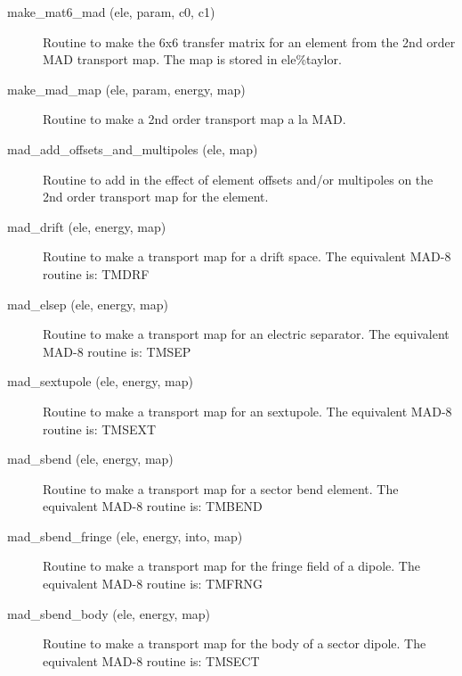 \begin{description}

\label{r:make.mat6.mad}
\item[make_mat6_mad (ele, param, c0, c1)] \Newline 
     Routine to make the 6x6 transfer matrix for an element from the 
     2nd order MAD transport map. The map is stored in ele\%taylor.

\label{r:make.mad.map}
\item[make_mad_map (ele, param, energy, map)] \Newline 
     Routine to make a 2nd order transport map a la MAD.

\label{r:mad.add.offsets.and.multipoles}
\item[mad_add_offsets_and_multipoles (ele, map)] \Newline 
     Routine to add in the effect of element offsets and/or multipoles
     on the 2nd order transport map for the element.

\label{r:mad.drift}
\item[mad_drift (ele, energy, map)] \Newline 
     Routine to make a transport map for a drift space.
     The equivalent MAD-8 routine is: TMDRF

\label{r:mad.elsep}
\item[mad_elsep (ele, energy, map)] \Newline 
     Routine to make a transport map for an electric separator. 
     The equivalent MAD-8 routine is: TMSEP

\label{r:mad.sextupole}
\item[mad_sextupole (ele, energy, map)] \Newline 
     Routine to make a transport map for an sextupole.
     The equivalent MAD-8 routine is: TMSEXT

\label{r:mad.sbend}
\item[mad_sbend (ele, energy, map)] \Newline 
     Routine to make a transport map for a sector bend element.
     The equivalent MAD-8 routine is: TMBEND

\label{r:mad.sbend.fringe}
\item[mad_sbend_fringe (ele, energy, into, map)] \Newline 
     Routine to make a transport map for the fringe field of a dipole.
     The equivalent MAD-8 routine is: TMFRNG

\label{r:mad.sbend.body}
\item[mad_sbend_body (ele, energy, map)] \Newline 
     Routine to make a transport map for the body of a sector dipole.
     The equivalent MAD-8 routine is: TMSECT


\end{description}
